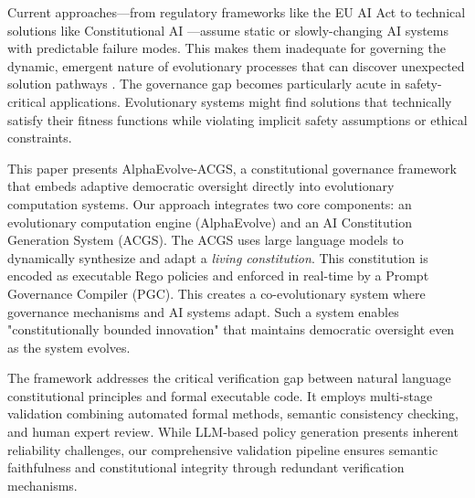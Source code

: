 \documentclass[manuscript,screen,review,anonymous,9pt]{acmart}
\begin{document}
Current approaches---from regulatory frameworks like the EU AI Act to technical solutions like Constitutional AI \cite{Bai2025ConstitutionalAI}---assume static or slowly-changing AI systems with predictable failure modes. This makes them inadequate for governing the dynamic, emergent nature of evolutionary processes that can discover unexpected solution pathways \cite{StanfordJBLP2024AIGovernanceWeb3, StanfordLaw2025BulletProof}. The governance gap becomes particularly acute in safety-critical applications. Evolutionary systems might find solutions that technically satisfy their fitness functions while violating implicit safety assumptions or ethical constraints.

This paper presents AlphaEvolve-ACGS, a constitutional governance framework that embeds adaptive democratic oversight directly into evolutionary computation systems. Our approach integrates two core components: an evolutionary computation engine (AlphaEvolve) and an AI Constitution Generation System (ACGS). The ACGS uses large language models to dynamically synthesize and adapt a \textit{living constitution}. This constitution is encoded as executable Rego policies and enforced in real-time by a Prompt Governance Compiler (PGC). This creates a co-evolutionary system where governance mechanisms and AI systems adapt. Such a system enables "constitutionally bounded innovation" that maintains democratic oversight even as the system evolves.

The framework addresses the critical verification gap between natural language constitutional principles and formal executable code. It employs multi-stage validation combining automated formal methods, semantic consistency checking, and human expert review. While LLM-based policy generation presents inherent reliability challenges, our comprehensive validation pipeline ensures semantic faithfulness and constitutional integrity through redundant verification mechanisms.
\end{document}
